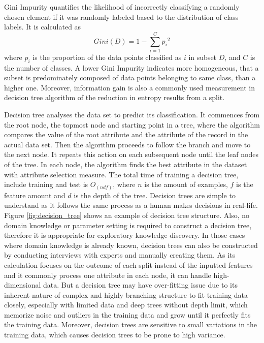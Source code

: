 \documentclass[12pt,a4paper,english
]{tunithesis}
\begin{document}
Gini Impurity quantifies the likelihood of incorrectly classifying a randomly chosen element if it was randomly labeled based to the distribution of class labels. It is calculated as 
\begin{equation}
    Gini(D) = 1-\sum_{i=1}^C {p_i}^2
\end{equation}
where ${p_i}$ is the proportion of the data points classified as ${i}$ in subset ${D}$, and ${C}$ is the number of classes. A lower Gini Impurity indicates more homogeneous, that a subset is predominately composed of data points belonging to same class, than a higher one. Moreover, information gain is also a commonly used measurement in decision tree algorithm of the reduction in entropy results from a split.

Decision tree analyses the data set to predict its classification. It commences from the root node, the topmost node and starting point in a tree, where the algorithm compares the value of the root attribute and the attribute of the record in the actual data set. Then the algorithm proceeds to follow the branch and move to the next node. It repeats this action on each subsequent node until the leaf nodes of the tree. In each node, the algorithm finds the best attribute in the dataset with attribute selection measure. The total time of training a decision tree, include training and test is ${O_{(ndf)}}$, where ${n}$ is the amount of examples, ${f}$ is the feature amount and ${d}$ is the depth of the tree. 
Decision trees are simple to understand as it follows the same process as a human makes decisions in real-life. Figure \ref{fig:decision_tree} shows an example of decision tree structure. Also, no domain knowledge or parameter setting is required to construct a decision tree, therefore it is appropriate for exploratory knowledge discovery. In those cases where domain knowledge is already known, decision trees can also be constructed by conducting interviews with experts and manually creating them. As its calculation focuses on the outcome of each split instead of the inputted features and it commonly process one attribute in each node, it can handle high-dimensional data. But a decision tree may have over-fitting issue due to its inherent nature of complex and highly branching structure to fit training data closely, especially with limited data and deep trees without depth limit, which memorize noise and outliers in the training data and grow until it perfectly fits the training data. Moreover, decision trees are sensitive to small variations in the training data, which causes decision trees to be prone to high variance.
\end{document}
